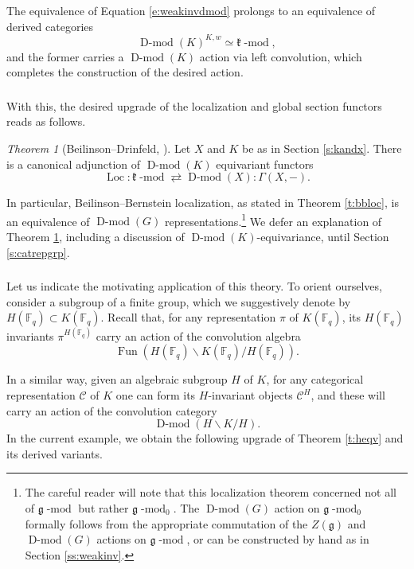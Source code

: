 \documentclass[10pt]{amsart}
\newcommand{\fg}{\mathfrak{g}}
\newcommand{\on}{\operatorname}
\renewcommand{\mod}{\on{-mod}}
\newcommand{\Dmod}{\on{D-mod}}
\newcommand{\Fq}{\mathbb{F}_q}
\newcommand{\Fun}{\on{Fun}}
\theoremstyle{remark}
\newcommand{\fk}{\mathfrak{k}}
\newtheorem{theo}[subsubsection]{Theorem}
\numberwithin{equation}{section}
\newcommand{\sC}{\mathscr{C}}
\renewcommand{\mod}{\operatorname{-mod}}
\begin{document}
The equivalence of Equation \eqref{e:weakinvdmod} prolongs to an equivalence of 
derived categories 
%
\[
    \Dmod(K)^{K, w} \simeq \fk\mod,
\]
%	
and the former carries a $\Dmod(K)$ action via left convolution, which 
completes the construction of the desired action. 


\subsubsection{} With this, the desired upgrade of the localization and global 
section functors reads as follows. 


\begin{theo}[Beilinson--Drinfeld, \cite{bdh}]\label{t:loc+equiv}  Let $X$ and $K$ be as in Section \ref{s:kandx}. There is a canonical adjunction of 
$\Dmod(K)$ equivariant functors 
	\[
	    \on{Loc}: \fk\mod \rightleftarrows \Dmod(X): \Gamma(X, -). 
	\]
\end{theo}


In particular, Beilinson--Bernstein localization, as stated in Theorem \ref{t:bbloc}, is an equivalence 
of $\Dmod(G)$ representations.\footnote{The careful reader will note that this localization theorem concerned not all of $\fg\mod$ but rather $\fg\mod_0$. The $\Dmod(G)$ action on $\fg\mod_0$ formally follows from the appropriate commutation of the $Z(\fg)$ and $\Dmod(G)$ actions on $\fg\mod$, or can be constructed by hand as in Section \ref{ss:weakinv}.} We defer an explanation of Theorem \ref{t:loc+equiv}, including a discussion of $\Dmod(K)$-equivariance, 
until Section \ref{s:catrepgrp}. 

\subsubsection{} Let us indicate the motivating application of this theory. 
To orient ourselves, consider a subgroup of a finite group, which we suggestively denote by $H(\Fq) \subset K(\Fq)$. Recall that, for any 
representation $\pi$ of $K(\Fq)$, its $H(\Fq)$ invariants $\pi^{H(\Fq)}$ carry 
an action of the 
convolution algebra $$\Fun(H(\Fq) \backslash K(\Fq) /H(\Fq)).$$

In a similar way, given an algebraic subgroup $H$ of $K$, for any categorical 
representation $\sC$ of $K$ one can form its $H$-invariant objects 
$\sC^H$, and 
these will carry an action of the convolution category 
%
\[
   \Dmod(H \backslash K  / H).
\]
%
In the current example, we obtain the following upgrade of Theorem \ref{t:heqv} 
and its derived variants. 
\end{document}

